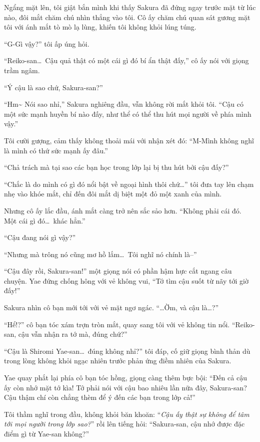 \documentclass[../main.tex]{subfiles}
\begin{document}
Ngẩng mặt lên, tôi giật bắn mình khi thấy Sakura đã đứng ngay trước mặt từ lúc nào, đôi mắt chăm chú nhìn thẳng vào tôi. Cô ấy chăm chú quan sát gương mặt tôi với ánh mắt tò mò lạ lùng, khiến tôi không khỏi lúng túng.

``G-Gì vậy?'' tôi ấp úng hỏi.

``Reiko-san\dots\ Cậu quả thật có một cái gì đó bí ẩn thật đấy,'' cô ấy nói với giọng trầm ngâm.

``Ý cậu là sao chứ, Sakura-san?''

``Hm\~{} Nói sao nhỉ,'' Sakura nghiêng đầu, vẫn không rời mắt khỏi tôi. ``Cậu có một sức mạnh huyền bí nào đấy, như thể có thể thu hút mọi người về phía mình vậy.''

Tôi cười gượng, cảm thấy không thoải mái với nhận xét đó: ``M-Mình không nghĩ là mình có thứ sức mạnh ấy đâu.''

``Chả trách mà tại sao các bạn học trong lớp lại bị thu hút bởi cậu đấy?''

``Chắc là do mình có gì đó nổi bật về ngoại hình thôi chứ\dots'' tôi đưa tay lên chạm nhẹ vào khóe mắt, chỉ đến đôi mắt dị biệt một đỏ một xanh của mình.

Nhưng cô ấy lắc đầu, ánh mắt càng trở nên sắc sảo hơn. ``Không phải cái đó. Một cái gì đó\dots\ khác hẳn.''

``Cậu đang nói gì vậy?''

``Nhưng mà trông nó cũng mơ hồ lắm\dots\ Tôi nghĩ nó chính là--''

``Cậu đây rồi, Sakura-san!'' một giọng nói có phần hậm hực cắt ngang câu chuyện. Yae đứng chống hông với vẻ không vui, ``Tớ tìm cậu suốt từ nãy tới giờ đấy!''

Sakura nhìn cô bạn mới tới với vẻ mặt ngơ ngác. ``\dots Ờm, và cậu là\dots?''

``Hể!?'' cô bạn tóc xám trợn tròn mắt, quay sang tôi với vẻ không tin nổi. ``Reiko-san, cậu vẫn nhận ra tớ mà, đúng chứ?''

``Cậu là Shiromi Yae-san\dots\ đúng không nhỉ?'' tôi đáp, cố giữ giọng bình thản dù trong lòng không khỏi ngạc nhiên trước phản ứng điềm nhiên của Sakura.

Yae quay phắt lại phía cô bạn tóc hồng, giọng càng thêm bực bội: ``Đến cả cậu ấy còn nhớ mặt tớ kìa! Tớ phải nói với cậu bao nhiêu lần nữa đây, Sakura-san? Cậu thậm chí còn chẳng thèm để ý đến các bạn trong lớp cả!''

Tôi thầm nghĩ trong đầu, không khỏi băn khoăn: ``\textit{Cậu ấy thật sự không để tâm tới mọi người trong lớp sao?}'' rồi lên tiếng hỏi: ``Sakura-san, cậu nhớ được đặc điểm gì từ Yae-san không?''
\end{document}
